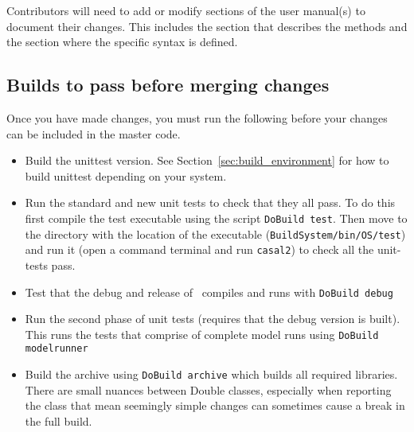Contributors will need to add or modify sections of the user manual(s) to document their changes. This includes the section that describes the methods and the section where the specific syntax is defined. 

\subsection{Builds to pass before merging changes}

Once you have made changes, you must run the following before your changes can be included in the master code. 

\begin{itemize}
	\item Build the unittest version. See Section~\ref{sec:build_environment} for how to build unittest depending on your system.
	\item Run the standard and new unit tests to check that they all pass. To do this first compile the test executable using the script \texttt{DoBuild test}. Then move to the directory with the location of the executable (\texttt{BuildSystem/bin/OS/test}) and run it (open a command terminal and run \texttt{casal2}) to check all the unit-tests pass.
	\item Test that the debug and release of \CNAME\ compiles and runs with \texttt{DoBuild debug}
	\item Run the second phase of unit tests (requires that the debug version is built). This runs the tests that comprise of complete model runs using \texttt{DoBuild modelrunner}
	\item Build the archive using \texttt{DoBuild archive} which builds all required libraries. There are small nuances between Double classes, especially when reporting the class that mean seemingly simple changes can sometimes cause a break in the full build.
\end{itemize}


